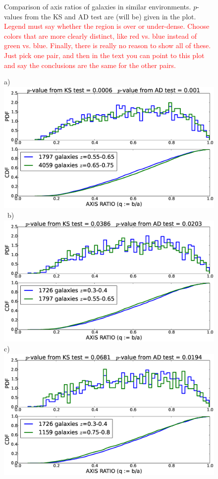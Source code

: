 \documentclass[twocolumn,useAMS,usenatbib]{mn2e}
\newcommand{\rachel}[1]{{\textcolor{red}{#1}}}
\begin{document}
\begin{figure}
 \caption{Comparison of axis ratios of galaxies in similar environments. $p$-values from the KS and AD test are (will be) given in the plot. \rachel{Legend must say whether the region is over or under-dense.  Choose colors that are more clearly distinct, like red vs. blue instead of green vs. blue.  Finally, there is really no reason to show all of these.  Just pick one pair, and then in the text you can point to this plot and say the conclusions are the same for the other pairs.}}
 \label{fig:axisratio_similar}
\end{figure}

\begin{figure}
 \centering
 a) \includegraphics[width=0.9\columnwidth]{axisratio(0)_0dot55-0dot65_0dot65-0dot75.eps} \
 b) \includegraphics[width=0.9\columnwidth]{axisratio(0)_0dot3-0dot4_0dot55-0dot65.eps} \\
 c) \includegraphics[width=0.9\columnwidth]{axisratio(0)_0dot3-0dot4_0dot75-0dot8.eps} \

\end{figure}
\end{document}
